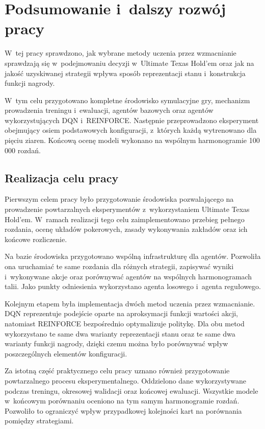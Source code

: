 \chapter*{Podsumowanie i~dalszy rozwój pracy}
\label{chap:wnioski}

W~tej pracy sprawdzono, jak wybrane metody uczenia przez wzmacnianie
sprawdzają się w~podejmowaniu decyzji w~Ultimate Texas Hold'em oraz jak
na jakość uzyskiwanej strategii wpływa sposób reprezentacji stanu
i~konstrukcja funkcji nagrody.

W~tym celu przygotowano kompletne środowisko symulacyjne gry,
mechanizm prowadzenia treningu i~ewaluacji, agentów bazowych oraz
agentów wykorzystujących DQN i~REINFORCE. Następnie przeprowadzono
eksperyment obejmujący osiem podstawowych konfiguracji, z~których każdą
wytrenowano dla pięciu ziaren. Końcową ocenę modeli wykonano na
wspólnym harmonogramie 100\,000 rozdań.

\section*{Realizacja celu pracy}
\label{sec:realizacja-celu-pracy}

Pierwszym celem pracy było przygotowanie środowiska pozwalającego na
prowadzenie powtarzalnych eksperymentów z~wykorzystaniem Ultimate
Texas Hold'em. W~ramach realizacji tego celu zaimplementowano przebieg
pełnego rozdania, ocenę układów pokerowych, zasady wykonywania zakładów
oraz ich końcowe rozliczenie.

Na bazie środowiska przygotowano wspólną infrastrukturę dla agentów.
Pozwoliła ona uruchamiać te same rozdania dla różnych strategii,
zapisywać wyniki i~wykonywane akcje oraz porównywać agentów na
wspólnych harmonogramach talii. Jako punkty odniesienia wykorzystano
agenta losowego i~agenta regułowego.

Kolejnym etapem była implementacja dwóch metod uczenia przez
wzmacnianie. DQN reprezentuje podejście oparte na aproksymacji funkcji
wartości akcji, natomiast REINFORCE bezpośrednio optymalizuje politykę.
Dla obu metod wykorzystano te same dwa warianty reprezentacji stanu
oraz te same dwa warianty funkcji nagrody, dzięki czemu można było
porównywać wpływ poszczególnych elementów konfiguracji.

Za istotną część praktycznego celu pracy uznano również przygotowanie
powtarzalnego procesu eksperymentalnego. Oddzielono dane
wykorzystywane podczas treningu, okresowej walidacji oraz końcowej
ewaluacji. Wszystkie modele w~końcowym porównaniu oceniono na tym
samym harmonogramie rozdań. Pozwoliło to ograniczyć wpływ
przypadkowej kolejności kart na porównania pomiędzy strategiami.

